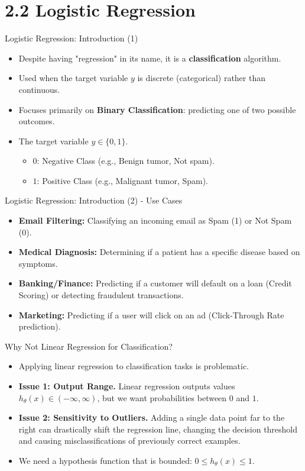 \documentclass[aspectratio=169]{beamer}
\begin{document}
\section{2.2 Logistic Regression}

\begin{frame}{Logistic Regression: Introduction (1)}
\begin{itemize}
    \item Despite having "regression" in its name, it is a \textbf{classification} algorithm.
    \item Used when the target variable $y$ is discrete (categorical) rather than continuous.
    \item Focuses primarily on \textbf{Binary Classification}: predicting one of two possible outcomes.
    \item The target variable $y \in \{0, 1\}$.
        \begin{itemize}
            \item $0$: Negative Class (e.g., Benign tumor, Not spam).
            \item $1$: Positive Class (e.g., Malignant tumor, Spam).
        \end{itemize}
\end{itemize}
\end{frame}

\begin{frame}{Logistic Regression: Introduction (2) - Use Cases}
\begin{itemize}
    \item \textbf{Email Filtering:} Classifying an incoming email as Spam (1) or Not Spam (0).
    \item \textbf{Medical Diagnosis:} Determining if a patient has a specific disease based on symptoms.
    \item \textbf{Banking/Finance:} Predicting if a customer will default on a loan (Credit Scoring) or detecting fraudulent transactions.
    \item \textbf{Marketing:} Predicting if a user will click on an ad (Click-Through Rate prediction).
\end{itemize}
\end{frame}

\begin{frame}{Why Not Linear Regression for Classification?}
\begin{itemize}
    \item Applying linear regression to classification tasks is problematic.
    \item \textbf{Issue 1: Output Range.} Linear regression outputs values $h_\theta(x) \in (-\infty, \infty)$, but we want probabilities between $0$ and $1$.
    \item \textbf{Issue 2: Sensitivity to Outliers.} Adding a single data point far to the right can drastically shift the regression line, changing the decision threshold and causing misclassifications of previously correct examples.
    \item We need a hypothesis function that is bounded: $0 \le h_\theta(x) \le 1$.
\end{itemize}
\end{frame}
\end{document}
